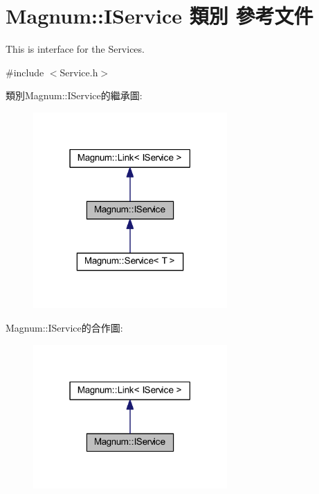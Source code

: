 \hypertarget{class_magnum_1_1_i_service}{}\section{Magnum\+:\+:I\+Service 類別 參考文件}
\label{class_magnum_1_1_i_service}


This is interface for the Services.  




{\ttfamily \#include $<$Service.\+h$>$}



類別\+Magnum\+:\+:I\+Service的繼承圖\+:\nopagebreak
\begin{figure}[H]
\begin{center}
\leavevmode
\includegraphics[width=210pt]{class_magnum_1_1_i_service__inherit__graph}
\end{center}
\end{figure}


Magnum\+:\+:I\+Service的合作圖\+:\nopagebreak
\begin{figure}[H]
\begin{center}
\leavevmode
\includegraphics[width=210pt]{class_magnum_1_1_i_service__coll__graph}
\end{center}
\end{figure}
